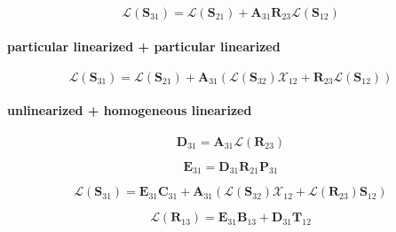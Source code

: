 \begin{equation}
\mathcal{L}(\mathbf{S}_{31}) = \mathcal{L}(\mathbf{S}_{21}) + \mathbf{A}_{31}\mathbf{R}_{23}\mathcal{L}(\mathbf{S}_{12})
\label{eq:adding-upward-tangent_linear-particular_linearized_p_unlinearized-V31}
\end{equation}


\paragraph{particular linearized + particular linearized}
\label{sec:adding-upward-tangent_linear-particular_linearized_particular_linearized}

\begin{equation}
\mathcal{L}(\mathbf{S}_{31}) = \mathcal{L}(\mathbf{S}_{21}) + \mathbf{A}_{31}(\mathcal{L}(\mathbf{S}_{32})\mathcal{X}_{12} + \mathbf{R}_{23}\mathcal{L}(\mathbf{S}_{12}))
\label{eq:adding-upward-tangent_linear-particular_linearized_particular_linearized-V31}
\end{equation}


\paragraph{unlinearized + homogeneous linearized}
\label{sec:adding-upward-tangent_linear-unlinearized_p_homogeneous_linearized}

\begin{equation}
\mathbf{D}_{31} = \mathbf{A}_{31}\mathcal{L}(\mathbf{R}_{23})
\label{eq:adding-upward-tangent_linear-unlinearized_p_homogeneous_linearized-D31}
\end{equation}

\begin{equation}
\mathbf{E}_{31} = \mathbf{D}_{31}\mathbf{R}_{21}\mathbf{P}_{31}
\label{eq:adding-upward-tangent_linear-unlinearized_p_homogeneous_linearized-E31}
\end{equation}

\begin{equation}
\mathcal{L}(\mathbf{S}_{31}) = \mathbf{E}_{31}\mathbf{C}_{31} + \mathbf{A}_{31}(\mathcal{L}(\mathbf{S}_{32})\mathcal{X}_{12} + \mathcal{L}(\mathbf{R}_{23})\mathbf{S}_{12})
\label{eq:adding-upward-tangent_linear-unlinearized_p_homogeneous_linearized-V31}
\end{equation}

\begin{equation}
\mathcal{L}(\mathbf{R}_{13}) = \mathbf{E}_{31}\mathbf{B}_{13} + \mathbf{D}_{31}\mathbf{T}_{12}
\label{eq:adding-upward-tangent_linear-unlinearized_p_homogeneous_linearized-U13}
\end{equation}

